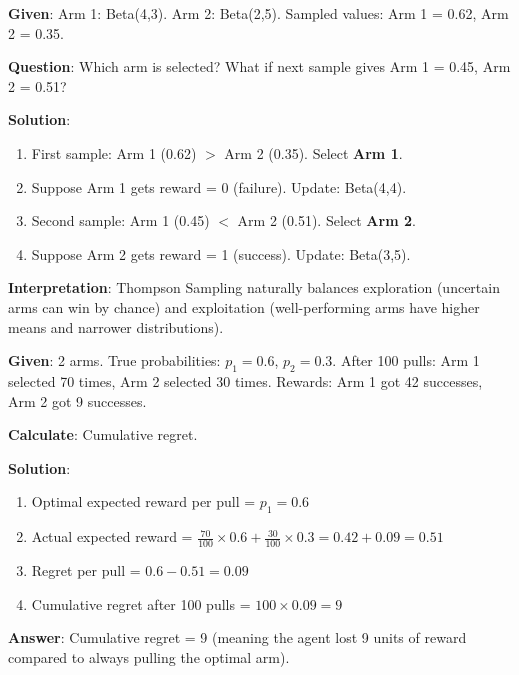 \documentclass[11pt,a4paper]{article}
\begin{document}
\begin{tcolorbox}[colback=green!5!white,colframe=green!75!black,title=\textbf{Worked Example 11: Thompson Sampling Decision}]
\textbf{Given}: Arm 1: Beta(4,3). Arm 2: Beta(2,5). Sampled values: Arm 1 = 0.62, Arm 2 = 0.35.

\textbf{Question}: Which arm is selected? What if next sample gives Arm 1 = 0.45, Arm 2 = 0.51?

\textbf{Solution}:
\begin{enumerate}
    \item First sample: Arm 1 (0.62) $>$ Arm 2 (0.35). Select \textbf{Arm 1}.
    \item Suppose Arm 1 gets reward = 0 (failure). Update: Beta(4,4).
    \item Second sample: Arm 1 (0.45) $<$ Arm 2 (0.51). Select \textbf{Arm 2}.
    \item Suppose Arm 2 gets reward = 1 (success). Update: Beta(3,5).
\end{enumerate}

\textbf{Interpretation}: Thompson Sampling naturally balances exploration (uncertain arms can win by chance) and exploitation (well-performing arms have higher means and narrower distributions).
\end{tcolorbox}

\begin{tcolorbox}[colback=green!5!white,colframe=green!75!black,title=\textbf{Worked Example 12: Thompson Sampling Regret Calculation}]
\textbf{Given}: 2 arms. True probabilities: $p_1 = 0.6$, $p_2 = 0.3$. After 100 pulls: Arm 1 selected 70 times, Arm 2 selected 30 times. Rewards: Arm 1 got 42 successes, Arm 2 got 9 successes.

\textbf{Calculate}: Cumulative regret.

\textbf{Solution}:
\begin{enumerate}
    \item Optimal expected reward per pull = $p_1 = 0.6$
    \item Actual expected reward = $\frac{70}{100} \times 0.6 + \frac{30}{100} \times 0.3 = 0.42 + 0.09 = 0.51$
    \item Regret per pull = $0.6 - 0.51 = 0.09$
    \item Cumulative regret after 100 pulls = $100 \times 0.09 = 9$
\end{enumerate}

\textbf{Answer}: Cumulative regret = 9 (meaning the agent lost 9 units of reward compared to always pulling the optimal arm).
\end{tcolorbox}
\end{document}
